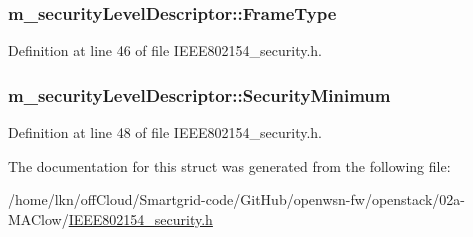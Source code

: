\subsubsection[{\texorpdfstring{Frame\+Type}{FrameType}}]{ m\+\_\+security\+Level\+Descriptor\+::\+Frame\+Type}\hypertarget{structm__security_level_descriptor_ad1be943ffda119a9606f1c2dbf93af39}{}\label{structm__security_level_descriptor_ad1be943ffda119a9606f1c2dbf93af39}


Definition at line 46 of file I\+E\+E\+E802154\+\_\+security.\+h.

\subsubsection[{\texorpdfstring{Security\+Minimum}{SecurityMinimum}}]{ m\+\_\+security\+Level\+Descriptor\+::\+Security\+Minimum}\hypertarget{structm__security_level_descriptor_a585de696912f72295532cefb716e239f}{}\label{structm__security_level_descriptor_a585de696912f72295532cefb716e239f}


Definition at line 48 of file I\+E\+E\+E802154\+\_\+security.\+h.



The documentation for this struct was generated from the following file\+:\begin{DoxyCompactItemize}
\item 
/home/lkn/off\+Cloud/\+Smartgrid-\/code/\+Git\+Hub/openwsn-\/fw/openstack/02a-\/\+M\+A\+Clow/\hyperlink{_i_e_e_e802154__security_8h}{I\+E\+E\+E802154\+\_\+security.\+h}\end{DoxyCompactItemize}
